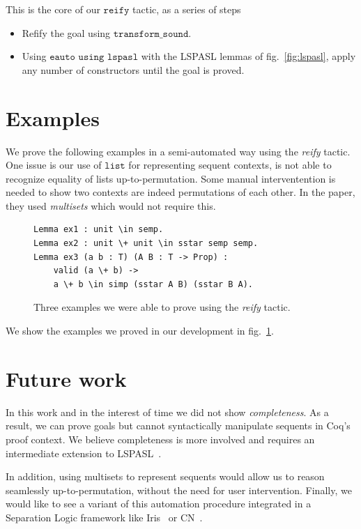 \documentclass[12pt,lettersize]{article}
\begin{document}
This is the core of our $\texttt{reify}$ tactic, as a series of steps
\begin{itemize}
\item Refify the goal using $\texttt{transform\_sound}$.
\item Using $\texttt{eauto using lspasl}$ with the LSPASL lemmas of fig.~\ref{fig:lspasl}, apply any number of constructors until the goal is proved.
\end{itemize}

\section{Examples}
We prove the following examples in a semi-automated way using the \emph{reify} tactic. One issue is our use of $\texttt{list}$ for representing
sequent contexts, is not able to recognize equality of lists up-to-permutation. Some manual interventention is needed to show two
contexts are indeed permutations of each other. In the paper, they used \emph{multisets} which would not require this.

\begin{figure}
\begin{lstlisting}[style=coq]
Lemma ex1 : unit \in semp.
Lemma ex2 : unit \+ unit \in sstar semp semp.
Lemma ex3 (a b : T) (A B : T -> Prop) :
    valid (a \+ b) ->
    a \+ b \in simp (sstar A B) (sstar B A).
\end{lstlisting}
\caption{Three examples we were able to prove using the \emph{reify} tactic.}
\label{fig:examples}
\end{figure}

We show the examples we proved in our development in fig.~\ref{fig:examples}.

\section{Future work}
In this work and in the interest of time we did not show \emph{completeness}.
As a result, we can prove goals but cannot syntactically manipulate sequents in Coq's proof context. We believe
completeness is more involved and requires an intermediate extension to LSPASL~\cite{hou2017proof}. 

In addition, using multisets to represent sequents would allow us to reason seamlessly up-to-permutation, without the need for user intervention.
Finally, we would like to see a variant of this automation procedure integrated in a Separation Logic framework like Iris~\cite{jung2018iris} or CN~\cite{pulte2023cn}.



\end{document}
